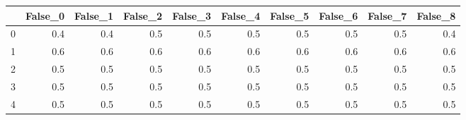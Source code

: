\begin{tabular}{lrrrrrrrrr}
\toprule
{} &  False\_0 &  False\_1 &  False\_2 &  False\_3 &  False\_4 &  False\_5 &  False\_6 &  False\_7 &  False\_8 \\ \hline
\midrule
0 &      0.4 &      0.4 &      0.5 &      0.5 &      0.5 &      0.5 &      0.5 &      0.5 &      0.4 \\ \hline
1 &      0.6 &      0.6 &      0.6 &      0.6 &      0.6 &      0.6 &      0.6 &      0.6 &      0.6 \\ \hline
2 &      0.5 &      0.5 &      0.5 &      0.5 &      0.5 &      0.5 &      0.5 &      0.5 &      0.5 \\ \hline
3 &      0.5 &      0.5 &      0.5 &      0.5 &      0.5 &      0.5 &      0.5 &      0.5 &      0.5 \\ \hline
4 &      0.5 &      0.5 &      0.5 &      0.5 &      0.5 &      0.5 &      0.5 &      0.5 &      0.5 \\ \hline
\bottomrule
\end{tabular}
